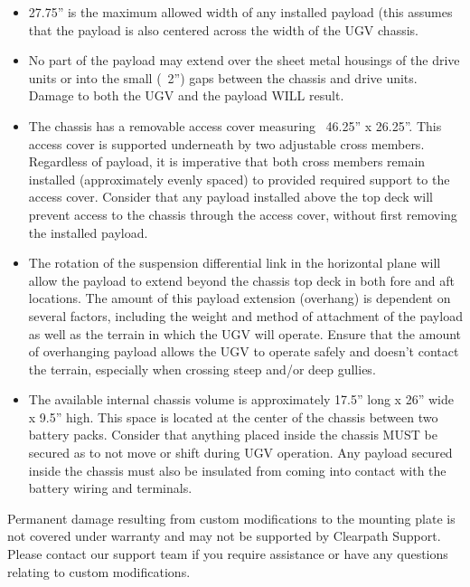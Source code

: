 \documentclass[]{clearpath-latex/clearpath-manual}
\begin{document}
\begin{itemize}[nolistsep]

\item 27.75” is the maximum allowed width of any installed payload (this assumes that the payload is also centered across the width of the UGV chassis.

\item  No part of the payload may extend over the sheet metal housings of the drive units or into the small (~2”) gaps between the chassis and drive units. Damage to both the UGV and the payload WILL result.

\item  The chassis has a removable access cover measuring ~46.25” x 26.25”. This access cover is supported underneath by two adjustable cross members. Regardless of payload, it is imperative that both cross members remain installed (approximately evenly spaced) to provided required support to the access cover. Consider that any payload installed above the top deck will prevent access to the chassis through the access cover, without first removing the installed payload.

\item  The rotation of the suspension differential link in the horizontal plane will allow the payload to extend beyond the chassis top deck in both fore and aft locations. The amount of this payload extension (overhang) is dependent on several factors, including the weight and method of attachment of the payload as well as the terrain in which the UGV will operate. Ensure that the amount of overhanging payload allows the UGV to operate safely and doesn’t contact the terrain, especially when crossing steep and/or deep gullies.

\item  The available internal chassis volume is approximately 17.5” long x 26” wide x 9.5” high. This space is located at the center of the chassis between two battery packs. Consider that anything placed inside the chassis MUST be secured as to not move or shift during UGV operation. Any payload secured inside the chassis must also be insulated from coming into contact with the battery wiring and terminals.

\end{itemize}




\begin{warning}[]
Permanent damage resulting from custom modifications to the mounting plate is not covered under warranty and may not be supported by Clearpath Support.  Please contact our support team if you require assistance or have any questions relating to custom modifications.
\end{warning}
\end{document}
